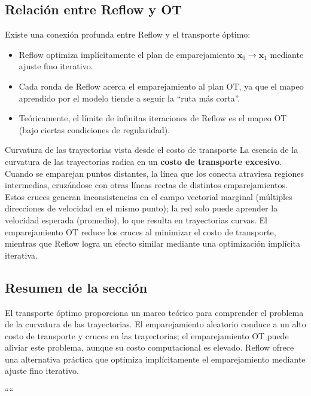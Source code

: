 \documentclass[a4paper]{article}
\begin{document}
\subsection{Relación entre Reflow y OT}

Existe una conexión profunda entre Reflow y el transporte óptimo:

\begin{itemize}
    \item Reflow optimiza implícitamente el plan de emparejamiento $\mathbf{x}_0 \to \mathbf{x}_1$ mediante ajuste fino iterativo.
    \item Cada ronda de Reflow acerca el emparejamiento al plan OT, ya que el mapeo aprendido por el modelo tiende a seguir la ``ruta más corta''.
    \item Teóricamente, el límite de infinitas iteraciones de Reflow es el mapeo OT (bajo ciertas condiciones de regularidad).
\end{itemize}

\begin{knowledgebox}{Curvatura de las trayectorias vista desde el costo de transporte}
La esencia de la curvatura de las trayectorias radica en un \textbf{costo de transporte excesivo}. Cuando se emparejan puntos distantes, la línea que los conecta atraviesa regiones intermedias, cruzándose con otras líneas rectas de distintos emparejamientos. Estos cruces generan inconsistencias en el campo vectorial marginal (múltiples direcciones de velocidad en el mismo punto); la red solo puede aprender la velocidad esperada (promedio), lo que resulta en trayectorias curvas. El emparejamiento OT reduce los cruces al minimizar el costo de transporte, mientras que Reflow logra un efecto similar mediante una optimización implícita iterativa.
\end{knowledgebox}

\subsection{Resumen de la sección}

El transporte óptimo proporciona un marco teórico para comprender el problema de la curvatura de las trayectorias. El emparejamiento aleatorio conduce a un alto costo de transporte y cruces en las trayectorias; el emparejamiento OT puede aliviar este problema, aunque su costo computacional es elevado. Reflow ofrece una alternativa práctica que optimiza implícitamente el emparejamiento mediante ajuste fino iterativo.

````
\end{document}
